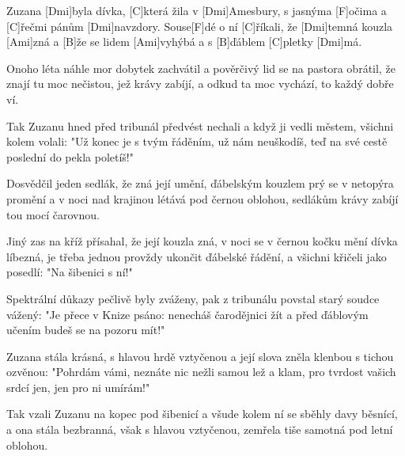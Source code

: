 
\sloka
Zuzana [Dmi]byla dívka, [C]která žila v [Dmi]Amesbury,
s jasnýma [F]očima a [C]řečmi pánům [Dmi]navzdory.
Souse[F]dé o ní [C]říkali, že [Dmi]temná kouzla [Ami]zná
a [B]že se lidem [Ami]vyhýbá a s [B]ďáblem [C]pletky [Dmi]má.

\sloka
Onoho léta náhle mor dobytek zachvátil
a pověrčivý lid se na pastora obrátil,
že znají tu moc nečistou, jež krávy zabíjí,
a odkud ta moc vychází, to každý dobře ví.

\sloka
Tak Zuzanu hned před tribunál předvést nechali
a když ji vedli městem, všichni kolem volali:
"Už konec je s tvým řáděním, už nám neuškodíš,
teď na své cestě poslední do pekla poletíš!"

\sloka
Dosvědčil jeden sedlák, že zná její umění,
ďábelským kouzlem prý se v netopýra promění
a v noci nad krajinou létává pod černou oblohou,
sedlákům krávy zabíjí tou mocí čarovnou.

\sloka
Jiný zas na kříž přísahal, že její kouzla zná,
v noci se v černou kočku mění dívka líbezná,
je třeba jednou provždy ukončit ďábelské řádění,
a všichni křičeli jako posedlí: "Na šibenici s ní!"

\sloka
Spektrální důkazy pečlivě byly zváženy,
pak z tribunálu povstal starý soudce vážený:
"Je přece v Knize psáno: nenecháš čarodějnici žít
a před ďáblovým učením budeš se na pozoru mít!"

\sloka
Zuzana stála krásná, s hlavou hrdě vztyčenou
a její slova zněla klenbou s tichou ozvěnou:
"Pohrdám vámi, neznáte nic nežli samou lež a klam,
pro tvrdost vašich srdcí jen, jen pro ni umírám!"

\sloka
Tak vzali Zuzanu na kopec pod šibenicí
a všude kolem ní se sběhly davy běsnící,
a ona stála bezbranná, však s hlavou vztyčenou,
zemřela tiše samotná pod letní oblohou.
